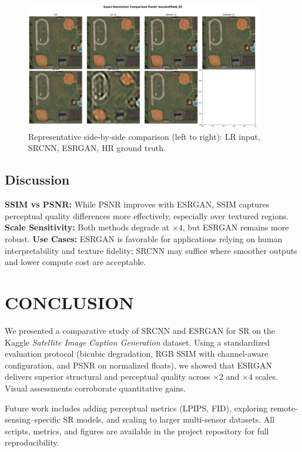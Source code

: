 \documentclass[]{spie}
\begin{document}
\begin{figure}[h!]
\centering
\includegraphics[width=0.92\textwidth]{baseballfield_60_panel.png}
\caption{Representative side-by-side comparison (left to right): LR input, SRCNN, ESRGAN, HR ground truth.}
\label{fig:side_by_side}
\end{figure}

\subsection{Discussion}
\textbf{SSIM vs PSNR:} While PSNR improves with ESRGAN, SSIM captures perceptual quality differences more effectively, especially over textured regions.  
\textbf{Scale Sensitivity:} Both methods degrade at $\times4$, but ESRGAN remains more robust.  
\textbf{Use Cases:} ESRGAN is favorable for applications relying on human interpretability and texture fidelity; SRCNN may suffice where smoother outputs and lower compute cost are acceptable.

\section{CONCLUSION}
We presented a comparative study of SRCNN and ESRGAN for SR on the Kaggle \textit{Satellite Image Caption Generation} dataset. Using a standardized evaluation protocol (bicubic degradation, RGB SSIM with channel-aware configuration, and PSNR on normalized floats), we showed that ESRGAN delivers superior structural and perceptual quality across $\times2$ and $\times4$ scales. Visual assessments corroborate quantitative gains.

Future work includes adding perceptual metrics (LPIPS, FID), exploring remote-sensing–specific SR models, and scaling to larger multi-sensor datasets. All scripts, metrics, and figures are available in the project repository \cite{github_repo} for full reproducibility.
\end{document}
